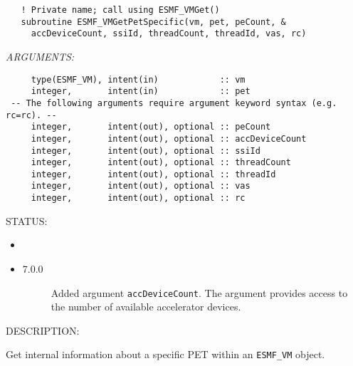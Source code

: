  
\begin{verbatim}   ! Private name; call using ESMF_VMGet()
   subroutine ESMF_VMGetPetSpecific(vm, pet, peCount, &
     accDeviceCount, ssiId, threadCount, threadId, vas, rc)\end{verbatim}{\em ARGUMENTS:}
\begin{verbatim}     type(ESMF_VM), intent(in)            :: vm
     integer,       intent(in)            :: pet
 -- The following arguments require argument keyword syntax (e.g. rc=rc). --
     integer,       intent(out), optional :: peCount
     integer,       intent(out), optional :: accDeviceCount
     integer,       intent(out), optional :: ssiId
     integer,       intent(out), optional :: threadCount
     integer,       intent(out), optional :: threadId
     integer,       intent(out), optional :: vas
     integer,       intent(out), optional :: rc\end{verbatim}
{\sf STATUS:}
   \begin{itemize}
   \item{}
   \item{}
   \begin{description}
   \item[7.0.0] Added argument {\tt accDeviceCount}.
     The argument provides access to the number of available accelerator devices.
   \end{description}
   \end{itemize}
  
{\sf DESCRIPTION:\\ }


     Get internal information about a specific PET within an {\tt ESMF\_VM} 
     object.
  
